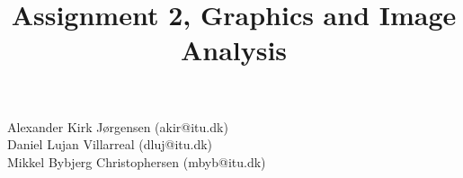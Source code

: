 \documentclass{article}
\title{Assignment 2, Graphics and Image Analysis}
\begin{document}
	\maketitle
	\begin{center}
	Alexander Kirk Jørgensen (akir@itu.dk)\\
	Daniel Lujan Villarreal (dluj@itu.dk)\\
	Mikkel Bybjerg Christophersen (mbyb@itu.dk)\\
		
	\newpage
	\tableofcontents
	\newpage
	\end{center}
	
	
	
\end{document}
